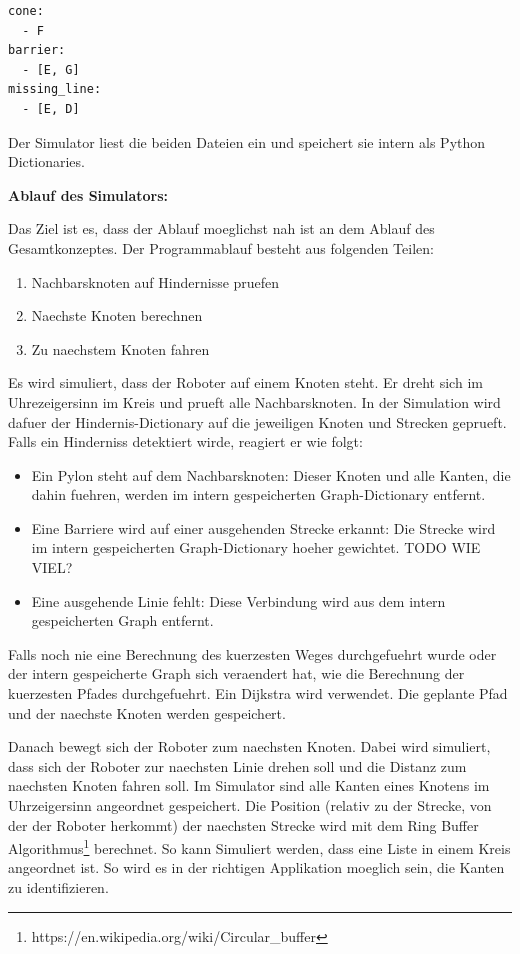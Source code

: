 \begin{verbatim}
cone:
  - F
barrier:
  - [E, G]
missing_line:
  - [E, D]
\end{verbatim}

Der Simulator liest die beiden Dateien ein und speichert sie intern als Python Dictionaries.

\textbf{Ablauf des Simulators:}

Das Ziel ist es, dass der Ablauf moeglichst nah ist an dem Ablauf des Gesamtkonzeptes.
Der Programmablauf besteht aus folgenden Teilen:
\begin{enumerate}
    \item Nachbarsknoten auf Hindernisse pruefen
    \item Naechste Knoten berechnen
    \item Zu naechstem Knoten fahren
\end{enumerate}

Es wird simuliert, dass der Roboter auf einem Knoten steht. Er dreht sich im Uhrezeigersinn im Kreis und prueft alle Nachbarsknoten. In der Simulation wird dafuer der Hindernis-Dictionary auf die jeweiligen Knoten und Strecken geprueft. Falls ein Hinderniss detektiert wirde, reagiert er wie folgt:

\begin{itemize}
    \item Ein Pylon steht auf dem Nachbarsknoten: Dieser Knoten und alle Kanten, die dahin fuehren, werden im intern gespeicherten Graph-Dictionary entfernt.
    \item Eine Barriere wird auf einer ausgehenden Strecke erkannt: Die Strecke wird im intern gespeicherten Graph-Dictionary hoeher gewichtet. TODO WIE VIEL?
    \item Eine ausgehende Linie fehlt: Diese Verbindung wird aus dem intern gespeicherten Graph entfernt.
\end{itemize}

Falls noch nie eine Berechnung des kuerzesten Weges durchgefuehrt wurde oder der intern gespeicherte Graph sich veraendert hat, wie die Berechnung der kuerzesten Pfades durchgefuehrt. Ein Dijkstra wird verwendet. Die geplante Pfad und der naechste Knoten werden gespeichert.

Danach bewegt sich der Roboter zum naechsten Knoten. Dabei wird simuliert, dass sich der Roboter zur naechsten Linie drehen soll und die Distanz zum naechsten Knoten fahren soll. Im Simulator sind alle Kanten eines Knotens im Uhrzeigersinn angeordnet gespeichert. Die Position (relativ zu der Strecke, von der der Roboter herkommt) der naechsten Strecke wird mit dem Ring Buffer Algorithmus\footnote{https://en.wikipedia.org/wiki/Circular\_buffer} berechnet. So kann Simuliert werden, dass eine Liste in einem Kreis angeordnet ist. So wird es in der richtigen Applikation moeglich sein, die Kanten zu identifizieren. 

